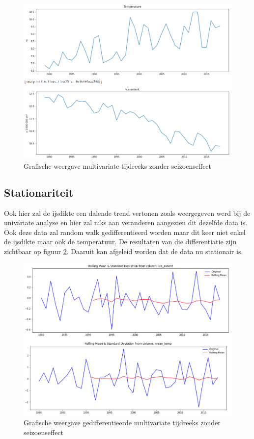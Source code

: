 \begin{figure}
    \centering
    \caption{Grafische weergave multivariate tijdreeks zonder seizoenseffect}
    \label{fig:mvnsdata}
    \includegraphics[width=1\linewidth]{mv_ns_data}
\end{figure}

\subsection{Stationariteit}

Ook hier zal de ijsdikte een dalende trend vertonen zoals weergegeven werd bij de univariate analyse en hier zal niks aan veranderen aangezien dit dezelfde data is. Ook deze data zal random walk gedifferentieerd worden maar dit keer niet enkel de ijsdikte maar ook de temperatuur. De resultaten van die differentiatie zijn zichtbaar op figuur \ref{fig:mvnsdatadiff}. Daaruit kan afgeleid worden dat de data nu stationair is.

\begin{figure}
    \centering
    \caption{Grafische weergave gedifferentieerde multivariate tijdreeks zonder seizoenseffect}
    \label{fig:mvnsdatadiff}
    \includegraphics[width=1\linewidth]{mv_ns_data_diff}
\end{figure}

